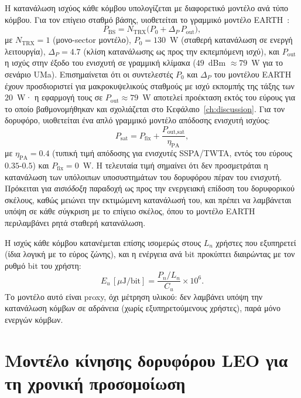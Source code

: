 Η κατανάλωση ισχύος κάθε κόμβου υπολογίζεται με διαφορετικό μοντέλο ανά
τύπο κόμβου. Για τον επίγειο σταθμό βάσης, υιοθετείται το γραμμικό μοντέλο
EARTH~\cite{auer2011earth}:
\begin{equation}
P_{\text{BS}} = N_{\text{TRX}}\big(P_0 + \Delta_P \, P_{\text{out}}\big),
\label{eq:earth-power}
\end{equation}
με $N_{\text{TRX}} = 1$ (μονο-sector μοντέλο), $P_0 = 130$~W (σταθερή
κατανάλωση σε ενεργή λειτουργία), $\Delta_P = 4.7$ (κλίση κατανάλωσης ως
προς την εκπεμπόμενη ισχύ), και $P_{\text{out}}$ η ισχύς στην έξοδο του
ενισχυτή σε γραμμική κλίμακα ($49$~dBm $\approx 79$~W για το σενάριο UMa).
Επισημαίνεται ότι οι συντελεστές $P_0$ και $\Delta_P$ του μοντέλου EARTH
έχουν προσδιοριστεί για μακροκυψελικούς σταθμούς με ισχύ εκπομπής της
τάξης των $20$~W· η εφαρμογή τους σε $P_{\text{out}} \approx 79$~W αποτελεί
προέκταση εκτός του εύρους για το οποίο βαθμονομήθηκαν και σχολιάζεται στο
Κεφάλαιο~\ref{ch:discussion}. Για τον δορυφόρο, υιοθετείται ένα απλό
γραμμικό μοντέλο απόδοσης ενισχυτή ισχύος:
\begin{equation}
P_{\text{sat}} = P_{\text{fix}} + \frac{P_{\text{out,sat}}}{\eta_{\text{PA}}},
\label{eq:pa-power}
\end{equation}
με $\eta_{\text{PA}} = 0.4$ (τυπική τιμή απόδοσης για ενισχυτές SSPA/TWTA,
εντός του εύρους $0.35$-$0.5$) και $P_{\text{fix}} = 0$~W. Η τελευταία
τιμή σημαίνει ότι δεν προσμετράται η κατανάλωση των υπόλοιπων υποσυστημάτων
του δορυφόρου πέραν του ενισχυτή. Πρόκειται για \emph{αισιόδοξη} παραδοχή
ως προς την ενεργειακή επίδοση του δορυφορικού σκέλους, καθώς μειώνει την
εκτιμώμενη κατανάλωσή του, και πρέπει να λαμβάνεται υπόψη σε κάθε σύγκριση
με το επίγειο σκέλος, όπου το μοντέλο EARTH περιλαμβάνει ρητά σταθερή
κατανάλωση.

Η ισχύς κάθε κόμβου κατανέμεται επίσης ισομερώς στους $L_n$ χρήστες που
εξυπηρετεί (ίδια λογική με το εύρος ζώνης), και η ενέργεια ανά bit
προκύπτει διαιρώντας με τον ρυθμό bit του χρήστη:
\begin{equation}
E_u \, [\mu\text{J/bit}] = \frac{P_n / L_n}{C_u} \times 10^6.
\label{eq:energy-per-bit}
\end{equation}
Το μοντέλο αυτό είναι proxy, όχι μέτρηση υλικού: δεν λαμβάνει υπόψη την
κατανάλωση κόμβων σε αδράνεια (χωρίς εξυπηρετούμενους χρήστες), παρά
μόνο ενεργών κόμβων.

\section{Μοντέλο κίνησης δορυφόρου LEO για τη χρονική προσομοίωση}
\label{sec:meth-temporal}

